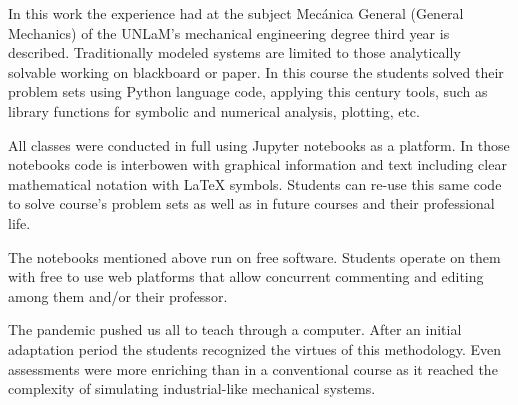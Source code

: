 In this work the experience had at the subject Mecánica General (General Mechanics) of the UNLaM’s mechanical engineering degree third year is described. Traditionally modeled systems are limited to those analytically solvable working on blackboard or paper. In this course the students solved their problem sets using Python language code, applying this century tools, such as library functions for symbolic and numerical analysis, plotting, etc.

All classes were conducted in full using Jupyter notebooks as a platform. In those notebooks code  is interbowen with graphical information and text including clear mathematical notation with LaTeX symbols. Students can re-use this same code to solve course’s problem sets as well as in future courses and their professional life.

The notebooks mentioned above run  on free software. Students operate on them with free to use web platforms that  allow concurrent commenting and editing among them and/or their professor.

The pandemic pushed us all to teach through a computer. After an initial adaptation period the students recognized the virtues of this methodology. Even assessments were more enriching than in a conventional course as it reached the complexity of simulating industrial-like mechanical systems.